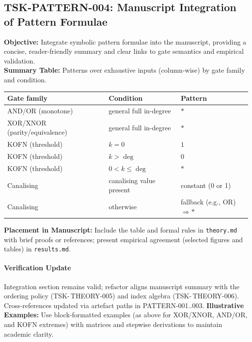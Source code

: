 \documentclass{article}
\begin{document}
\subsection{TSK-PATTERN-004: Manuscript Integration of Pattern Formulae}
\textbf{Objective:} Integrate symbolic pattern formulae into the manuscript, providing a concise, reader-friendly summary and clear links to gate semantics and empirical validation.\\
\textbf{Summary Table:} Patterns over exhaustive inputs (column-wise) by gate family and condition.
\begin{center}
\begin{tabular}{lll}
\toprule
\textbf{Gate family} & \textbf{Condition} & \textbf{Pattern} \\
\midrule
AND/OR (monotone) & general full in-degree & $*$ \\
XOR/XNOR (parity/equivalence) & general full in-degree & $*$ \\
KOFN (threshold) & $k=0$ & $1$ \\
KOFN (threshold) & $k>\deg$ & $0$ \\
KOFN (threshold) & $0<k\leq \deg$ & $*$ \\
Canalising & canalising value present & constant (0 or 1) \\
Canalising & otherwise & fallback (e.g., OR) \;$\Rightarrow$\;$*$ \\
\bottomrule
\end{tabular}
\end{center}
\textbf{Placement in Manuscript:} Include the table and formal rules in \texttt{theory.md} with brief proofs or references; present empirical agreement (selected figures and tables) in \texttt{results.md}.\\
\paragraph{Verification Update} Integration section remains valid; refactor aligns manuscript summary with the ordering policy (TSK-\,THEORY-005) and index algebra (TSK-\,THEORY-006). Cross-references updated via artefact paths in PATTERN-001..003.
\textbf{Illustrative Examples:} Use block-formatted examples (as above for XOR/XNOR, AND/OR, and KOFN extremes) with matrices and stepwise derivations to maintain academic clarity.\\
\end{document}
